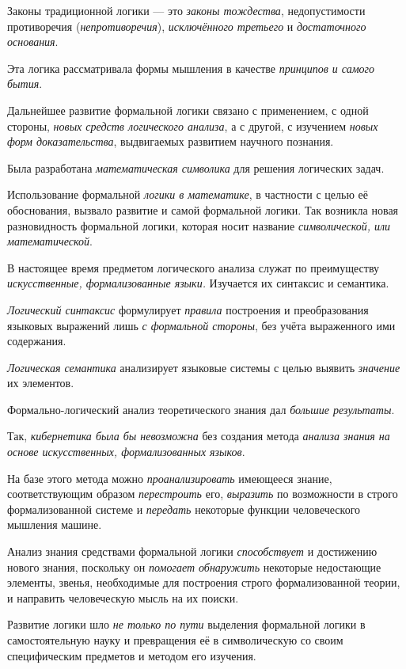 \documentclass[a4paper,14pt,russian]{extreport}
\begin{document}
Законы традиционной логики --- это \emph{законы тождества}, недопустимости противоречия (\emph{непротиворечия}), \emph{исключённого третьего} и \emph{достаточного основания}.

Эта логика рассматривала формы мышления в качестве \emph{принципов и самого бытия}.

Дальнейшее развитие формальной логики связано с применением, с одной стороны, \emph{новых средств логического анализа}, а с другой, с изучением \emph{новых форм доказательства}, выдвигаемых развитием научного познания.

Была разработана \emph{математическая символика} для решения логических задач.

Использование формальной \emph{логики в математике}, в частности с целью её обоснования, вызвало развитие и самой формальной логики. Так возникла новая разновидность формальной логики, которая носит название \emph{символической, или математической}.

В настоящее время предметом логического анализа служат по преимуществу \emph{искусственные, формализованные языки.} Изучается их синтаксис и семантика.

\emph{Логический синтаксис} формулирует \emph{правила} построения и преобразования языковых выражений лишь \emph{с формальной стороны}, без учёта выраженного ими содержания.

\emph{Логическая семантика} анализирует языковые системы с целью выявить \emph{значение} их элементов.

Формально-логический анализ теоретического знания дал \emph{большие результаты}.

Так, \emph{кибернетика была бы невозможна} без создания метода \emph{анализа знания на основе искусственных, формализованных языков}.

На базе этого метода можно \emph{проанализировать} имеющееся знание, соответствующим образом \emph{перестроить} его, \emph{выразить} по возможности в строго формализованной системе и \emph{передать} некоторые функции человеческого мышления машине.

Анализ знания средствами формальной логики \emph{способствует} и достижению нового знания, поскольку он \emph{помогает обнаружить} некоторые недостающие элементы, звенья, необходимые для построения строго формализованной теории, и направить человеческую мысль на их поиски.

Развитие логики шло \emph{не только по пути} выделения формальной логики в самостоятельную науку и превращения её в символическую со своим специфическим предметов и методом его изучения.
\end{document}

